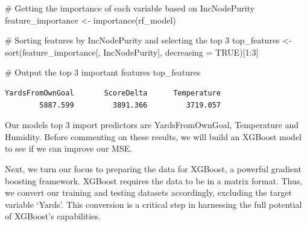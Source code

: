 \documentclass[
  super,
  preprint,
  3p]{elsarticle}
\newenvironment{Shaded}{\begin{snugshade}}{\end{snugshade}}
\newcommand{\AttributeTok}[1]{\textcolor[rgb]{0.40,0.45,0.13}{#1}}
\newcommand{\CommentTok}[1]{\textcolor[rgb]{0.37,0.37,0.37}{#1}}
\newcommand{\ConstantTok}[1]{\textcolor[rgb]{0.56,0.35,0.01}{#1}}
\newcommand{\DecValTok}[1]{\textcolor[rgb]{0.68,0.00,0.00}{#1}}
\newcommand{\FunctionTok}[1]{\textcolor[rgb]{0.28,0.35,0.67}{#1}}
\newcommand{\NormalTok}[1]{\textcolor[rgb]{0.00,0.23,0.31}{#1}}
\newcommand{\OtherTok}[1]{\textcolor[rgb]{0.00,0.23,0.31}{#1}}
\newcommand{\SpecialCharTok}[1]{\textcolor[rgb]{0.37,0.37,0.37}{#1}}
\newcommand{\StringTok}[1]{\textcolor[rgb]{0.13,0.47,0.30}{#1}}
\begin{document}
\begin{Shaded}
\begin{Highlighting}[]
\CommentTok{\# Getting the importance of each variable based on IncNodePurity}
\NormalTok{feature\_importance }\OtherTok{\textless{}{-}} \FunctionTok{importance}\NormalTok{(rf\_model)}

\CommentTok{\# Sorting features by IncNodePurity and selecting the top 3}
\NormalTok{top\_features }\OtherTok{\textless{}{-}} \FunctionTok{sort}\NormalTok{(feature\_importance[, }\StringTok{\textquotesingle{}IncNodePurity\textquotesingle{}}\NormalTok{], }\AttributeTok{decreasing =} \ConstantTok{TRUE}\NormalTok{)[}\DecValTok{1}\SpecialCharTok{:}\DecValTok{3}\NormalTok{]}

\CommentTok{\# Output the top 3 important features}
\NormalTok{top\_features}
\end{Highlighting}
\end{Shaded}

\begin{verbatim}
YardsFromOwnGoal       ScoreDelta      Temperature 
        5887.599         3891.366         3719.057 
\end{verbatim}

Our models top 3 import predictors are YardsFromOwnGoal, Temperature and
Humidity. Before commenting on these results, we will build an XGBoost
model to see if we can improve our MSE.

Next, we turn our focus to preparing the data for XGBoost, a powerful
gradient boosting framework. XGBoost requires the data to be in a matrix
format. Thus, we convert our training and testing datasets accordingly,
excluding the target variable `Yards'. This conversion is a critical
step in harnessing the full potential of XGBoost's capabilities.

\begin{Shaded}
\end{Shaded}
\end{document}
